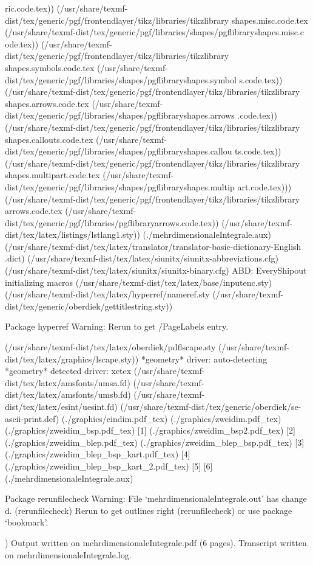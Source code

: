 ric.code.tex))
(/usr/share/texmf-dist/tex/generic/pgf/frontendlayer/tikz/libraries/tikzlibrary
shapes.misc.code.tex
(/usr/share/texmf-dist/tex/generic/pgf/libraries/shapes/pgflibraryshapes.misc.c
ode.tex))
(/usr/share/texmf-dist/tex/generic/pgf/frontendlayer/tikz/libraries/tikzlibrary
shapes.symbols.code.tex
(/usr/share/texmf-dist/tex/generic/pgf/libraries/shapes/pgflibraryshapes.symbol
s.code.tex))
(/usr/share/texmf-dist/tex/generic/pgf/frontendlayer/tikz/libraries/tikzlibrary
shapes.arrows.code.tex
(/usr/share/texmf-dist/tex/generic/pgf/libraries/shapes/pgflibraryshapes.arrows
.code.tex))
(/usr/share/texmf-dist/tex/generic/pgf/frontendlayer/tikz/libraries/tikzlibrary
shapes.callouts.code.tex
(/usr/share/texmf-dist/tex/generic/pgf/libraries/shapes/pgflibraryshapes.callou
ts.code.tex))
(/usr/share/texmf-dist/tex/generic/pgf/frontendlayer/tikz/libraries/tikzlibrary
shapes.multipart.code.tex
(/usr/share/texmf-dist/tex/generic/pgf/libraries/shapes/pgflibraryshapes.multip
art.code.tex)))
(/usr/share/texmf-dist/tex/generic/pgf/frontendlayer/tikz/libraries/tikzlibrary
arrows.code.tex
(/usr/share/texmf-dist/tex/generic/pgf/libraries/pgflibraryarrows.code.tex))
(/usr/share/texmf-dist/tex/latex/listings/lstlang1.sty))
(./mehrdimensionaleIntegrale.aux)
(/usr/share/texmf-dist/tex/latex/translator/translator-basic-dictionary-English
.dict) (/usr/share/texmf-dist/tex/latex/siunitx/siunitx-abbreviations.cfg)
(/usr/share/texmf-dist/tex/latex/siunitx/siunitx-binary.cfg)
ABD: EveryShipout initializing macros
(/usr/share/texmf-dist/tex/latex/base/inputenc.sty)
(/usr/share/texmf-dist/tex/latex/hyperref/nameref.sty
(/usr/share/texmf-dist/tex/generic/oberdiek/gettitlestring.sty))

Package hyperref Warning: Rerun to get /PageLabels entry.

(/usr/share/texmf-dist/tex/latex/oberdiek/pdflscape.sty
(/usr/share/texmf-dist/tex/latex/graphics/lscape.sty))
*geometry* driver: auto-detecting
*geometry* detected driver: xetex
(/usr/share/texmf-dist/tex/latex/amsfonts/umsa.fd)
(/usr/share/texmf-dist/tex/latex/amsfonts/umsb.fd)
(/usr/share/texmf-dist/tex/latex/esint/uesint.fd)
(/usr/share/texmf-dist/tex/generic/oberdiek/se-ascii-print.def)
(./graphics/eindim.pdf_tex) (./graphics/zweidim.pdf_tex)
(./graphics/zweidim_bsp.pdf_tex) [1] (./graphics/zweidim_bsp2.pdf_tex) [2]
(./graphics/zweidim_blep.pdf_tex) (./graphics/zweidim_blep_bsp.pdf_tex)
[3] (./graphics/zweidim_blep_bsp_kart.pdf_tex) [4]
(./graphics/zweidim_blep_bsp_kart_2.pdf_tex) [5] [6]
(./mehrdimensionaleIntegrale.aux)

Package rerunfilecheck Warning: File `mehrdimensionaleIntegrale.out' has change
d.
(rerunfilecheck)                Rerun to get outlines right
(rerunfilecheck)                or use package `bookmark'.

 )
Output written on mehrdimensionaleIntegrale.pdf (6 pages).
Transcript written on mehrdimensionaleIntegrale.log.
